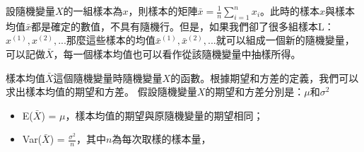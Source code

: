 \documentclass[11pt]{article}
\providecommand{\tightlist}{%
      \setlength{\itemsep}{0pt}\setlength{\parskip}{0pt}}
\begin{document}
設隨機變量\(X\)的一組樣本為\(x\)，則樣本的矩陣\(\bar{x} = \frac{1}{n} \displaystyle \sum_{i=1}^{n}x_i\)。此時的樣本\(x\)與樣本均值\(\bar{x}\)都是確定的數值，不具有隨機行。但是，如果我們卻了很多組樣本L：\(x^{(1)}, x^{(2)}, ...\)那麼這些樣本的均值\(\bar{x}^{(1)}, \bar{x}^{(2)}, ...\)就可以組成一個新的隨機變量，可以記做\(\bar{X}\)，每一個樣本均值也可以看作從該隨機變量中抽樣所得。

樣本均值\(\bar{X}\)這個隨機變量時隨機變量\(X\)的函數。根據期望和方差的定義，我們可以求出樣本均值的期望和方差。
假設隨機變量\(X\)的期望和方差分別是：\(\mu\)和\(\sigma^2\)

\begin{itemize}
\tightlist
\item
  E(\(\bar{X}\)) = \(\mu\)，樣本均值的期望與原隨機變量的期望相同；
\item
  Var(\(\bar{X}\)) =
  \(\frac{\sigma^2}{n}\)，其中\(n\)為每次取樣的樣本量，
\end{itemize}
\end{document}

